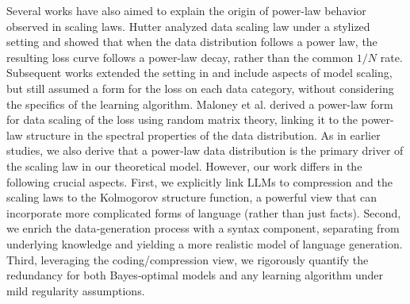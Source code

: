 \documentclass[11pt]{article}
\theoremstyle{plain}
\theoremstyle{definition}
\begin{document}
Several works have also aimed to explain the origin of power-law behavior observed in scaling laws. Hutter \citep{hutter2021learning} analyzed data scaling law under a stylized setting and showed that when the data distribution follows a power law, the resulting loss curve follows a power-law decay, rather than the common $1/N$ rate. Subsequent works \citep{michaud2023quantization, brill2024neural} extended the setting in \citep{hutter2021learning} and include aspects of model scaling, but still assumed a form for the loss on each data category, without considering the specifics of the learning algorithm. Maloney et al. \citep{maloney2022solvable} derived a power-law form for data scaling of the loss using random matrix theory, linking it to the power-law structure in the spectral properties of the data distribution. 
As in earlier studies, we also derive that a power‑law data distribution is the primary driver of the scaling law in our theoretical model. However, our work differs in the following crucial aspects. 
First, we explicitly link LLMs to compression and the scaling laws to the Kolmogorov structure function, a powerful view that can incorporate more complicated forms of language (rather than just facts). Second, we enrich the data‑generation process with a syntax component, separating from underlying knowledge and yielding a more realistic model of language generation. Third, leveraging the coding/compression view, we rigorously quantify the redundancy for both Bayes‑optimal models and any learning algorithm under mild regularity assumptions. 
\end{document}
